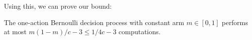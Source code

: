 \begin{comment}
	\begin{proof}
	Take any $s^*\in S'$, and note that all states the chain can transition
	to from $s^*$ are also in $S'$, by transition closure.  Defining $m(s) = \max_i\mu_i(s)$, 
	observe the myopic stopping for all such states implies that
	\begin{align*}
		\IE^{\pi}[(m(S_{j+1}) - c)\, 1(j<N)\given S_0=s^*] \\
		\le \IE^{\pi}[m(S_{j})\, 1(j<N)\given S_0=s^*]
	\end{align*}
	holds for all $j$, and as a result:
	\begin{align*}
		V^\pi(s) 
		&= \IE^{\pi}[ - c N + m(S_N) \given S_0=s^*] \\
		&= \IE^{\pi}[m(S_0) + \sum_{j=0}^{N-1} (m(S_{j+1}) - c - m(S_j)) \given S_0=s^*] \\
		&\le \max_i\mu_i(s^*) \qedhere
	\end{align*}
	\end{proof}	
\end{comment}

Using this, we can prove our bound:

\begin{thm}\label{thm:one-action-bound}
	The one-action Bernoulli decision process with constant arm $m\in[0,1]$ 
	performs at most $m(1-m)/c-3 \le 1/4c-3$ computations.
\end{thm}

\begin{comment}
	\begin{proof}
		By \dfnref{dfn:myopic} and \exampleref{example:bernoulli2}, the myopic policy stops in
		a state $(s,f)$ when
		\begin{align}
			c \ge &\mu\max(\mu^+,m) + (1-\mu_i)\max(\mu^-, m) - \max(\mu,m) \label{eq:stopping}
		\end{align}
		where $\mu=(s+1)/(n+2)$  is the mean utility for action~2, where $n=s+f$,
		$\mu^- = \mu - \mu/(n+3)$, and $\mu^+ = \mu + (1-\mu)/(n+3)$
		are the posterior means of action 2 after simulating a failure and a success,
		respectively.  Whenever \eqref{eq:stopping} holds, stopping is preferred to sampling.

		Fixing $n$ and maximizing over $\mu$, we get sufficient condition for stopping
		\begin{equation}
			c \ge \frac{m(1-m)}{(n_i+3)} \qquad\qquad   n_i\ge \frac{m(1-m)}{c} - 3  \label{eq:myopic-stopping}
		\end{equation}
		Since the set of states satisfying \eqref{eq:myopic-stopping} is closed under
		transitions ($n$ only increases), by \thmref{thm:optimal-myopic}.  Finally, note $\max_{m\in[0,1]} m(1-m)=1/4$.
	\end{proof}	
\end{comment}

